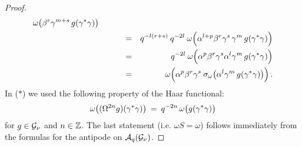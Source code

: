 \begin{proof}
\begin{eqnarray*}
        \omega \!\left( \beta^r \gamma^{m+s} \, g(\gamma^*\gamma) \vertM \right)  \\
&\hspace{3em}=& q^{-l(r+s)}\: q^{-2l}\: \omega \!\left( \alpha^{l+p} \beta^r
        \gamma^s \, \gamma^m   \, g(\gamma^*\gamma)   \vertL \right)  \\
&\hspace{3em}=&
 q^{-2l}\: \omega \!\left( \alpha^p \beta^r \gamma^s \alpha^l
             \gamma^m \, g(\gamma^*\gamma)  \vertL \right)  \\
&\hspace{3em}=&
  \omega \!\left( \alpha^p \beta^r \gamma^s  \: \sigma_\omega \! \left( \alpha^l
               \gamma^m \, g(\gamma^*\gamma) \vertM \right) \! \vertL \right).
\end{eqnarray*}
In ($*$) we used the following property of the Haar functional:
$$ \omega \!\left( (\Omega^{2n} g)(\gamma^*\gamma) \vertM \right)
     \:=\:  q^{-2n} \, \omega \!\left( g(\gamma^*\gamma) \vertM \right) $$
for $g\in \mathcal G_\nu$ and $n\in\mathbb{Z}$.
The last statement (i.e. $\omega S = \omega$) follows immediately from
the formulas for the antipode on ${\mathcal A}_q(\mathcal G_\nu)$.
\end{proof}
